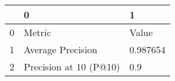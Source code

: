 \begin{tabular}{lll}
\toprule
{} &                       0 &         1 \\
\midrule
0 &                  Metric &     Value \\
1 &       Average Precision &  0.987654 \\
2 &  Precision at 10 (P@10) &       0.9 \\
\bottomrule
\end{tabular}
